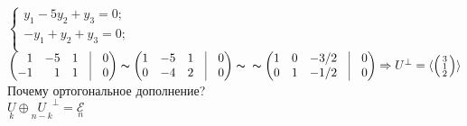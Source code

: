 $\left\{
\begin{aligned}
y_1-5y_2+y_3=0;\\
-y_1+y_2+y_3=0;\\
\end{aligned}
\right.$ \:\:\:
$\begin{pmatrix*}[r]
1 & -5 & 1 & \vrule & 0\\
-1 & 1 & 1 & \vrule & 0\\
\end{pmatrix*}
\thicksim
\begin{pmatrix*}[r]
1 & -5 & 1 & \vrule & 0\\
0 & -4 & 2 & \vrule & 0\\
\end{pmatrix*}
\thicksim \\
\thicksim
\begin{pmatrix*}[r]
1 & 0 & -3/2 & \vrule & 0\\
0 & 1 & -1/2 & \vrule & 0\\
\end{pmatrix*}
\Rightarrow
U^{\perp}=
\langle \left(
\begin{smallmatrix*}[r]
3\\ 1\\ 2\\ 
\end{smallmatrix*}
\right) \rangle $\\

Почему ортогональное дополнение?\\
$\underset{k}U\oplus \underset{n-k}U^{\perp}= \underset{n}{\mathcal{E}}$\\